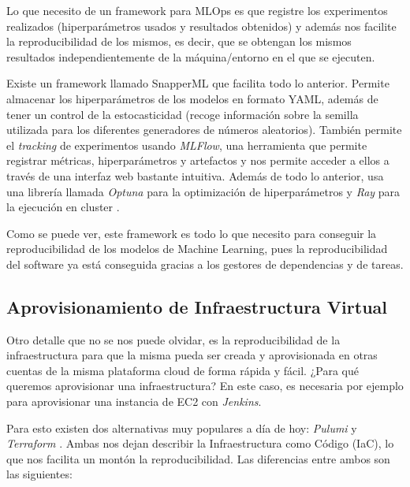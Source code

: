 Lo que necesito de un framework para MLOps es que registre los experimentos realizados (hiperparámetros usados y resultados obtenidos) y además nos facilite la reproducibilidad de los mismos, es decir, que se obtengan los mismos resultados independientemente de la máquina/entorno en el que se ejecuten.\newline

Existe un framework llamado SnapperML que facilita todo lo anterior. Permite almacenar los hiperparámetros de los modelos en formato YAML, además de tener un control de la estocasticidad (recoge información sobre la semilla utilizada para los diferentes generadores de números aleatorios). También permite el \textit{tracking} de experimentos usando \textit{MLFlow}, una herramienta que permite registrar métricas, hiperparámetros y artefactos y nos permite acceder a ellos a través de una interfaz web bastante intuitiva. Además de todo lo anterior, usa una librería llamada \textit{Optuna} para la optimización de hiperparámetros y \textit{Ray} para la ejecución en cluster \cite{snapperml}.\newline

Como se puede ver, este framework es todo lo que necesito para conseguir la reproducibilidad de los modelos de Machine Learning, pues la reproducibilidad del software ya está conseguida gracias a los gestores de dependencias y de tareas.

\subsection{Aprovisionamiento de Infraestructura Virtual}

Otro detalle que no se nos puede olvidar, es la reproducibilidad de la infraestructura para que la misma pueda ser creada y aprovisionada en otras cuentas de la misma plataforma cloud de forma rápida y fácil. ¿Para qué queremos aprovisionar una infraestructura? En este caso, es necesaria por ejemplo para aprovisionar una instancia de EC2 con \textit{Jenkins}.\newline

Para esto existen dos alternativas muy populares a día de hoy: \textit{Pulumi} \cite{pulumi} y \textit{Terraform} \cite{Terraform}. Ambas nos dejan describir la Infraestructura como Código (IaC), lo que nos facilita un montón la reproducibilidad. Las diferencias entre ambos son las siguientes:

